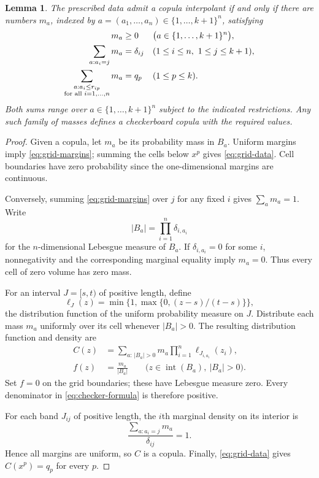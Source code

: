 \documentclass[a4paper,11pt]{amsart}
\numberwithin{equation}{section}
\newtheorem{lemma}[lemma]{Lemma}
\theoremstyle{definition}
\theoremstyle{remark}
\begin{document}
\begin{lemma}\label{lem:grid}
The prescribed data admit a copula interpolant if and only if there
are numbers $m_a$, indexed by
$a=(a_1,\ldots,a_n)\in\{1,\ldots,k+1\}^n$, satisfying
\begin{align}
 m_a&\geq0
 &&\bigl(a\in\{1,\ldots,k+1\}^n\bigr),\notag\\
 \sum_{a:a_i=j}m_a&=\delta_{ij}
 &&(1\leq i\leq n,\ 1\leq j\leq k+1),\label{eq:grid-margins}\\
 \sum_{\substack{a:a_i\leq r_{ip}\\
                  \text{for all }i=1,\ldots,n}}m_a&=q_p
 &&(1\leq p\leq k).\label{eq:grid-data}
\end{align}
Both sums range over $a\in\{1,\ldots,k+1\}^n$ subject to the indicated
restrictions. Any such family of masses defines a checkerboard copula
with the required values.
\end{lemma}
\begin{proof}
Given a copula, let $m_a$ be its probability mass in $B_a$. Uniform
margins imply \eqref{eq:grid-margins}; summing the cells below $x^p$
gives \eqref{eq:grid-data}. Cell boundaries have zero probability
since the one-dimensional margins are continuous.

Conversely, summing \eqref{eq:grid-margins} over $j$ for any fixed
$i$ gives $\sum_a m_a=1$. Write
\[
 |B_a|=\prod_{i=1}^n\delta_{i,a_i}
\]
for the $n$-dimensional Lebesgue measure of $B_a$.
If $\delta_{i,a_i}=0$ for some $i$, nonnegativity and the corresponding
marginal equality imply $m_a=0$. Thus every cell of zero volume has
zero mass.

For an interval $J=[s,t)$ of positive length, define
\[
 \ell_J(z)=\min\{1,\max\{0,(z-s)/(t-s)\}\},
\]
the distribution function of the uniform probability measure on $J$.
Distribute each mass $m_a$ uniformly over its cell whenever $|B_a|>0$.
The resulting distribution function and density are
\begin{equation}
\begin{aligned}
 C(z)&=\sum_{a:\,|B_a|>0}
          m_a\prod_{i=1}^n\ell_{J_{i,a_i}}(z_i),\\
 f(z)&=\frac{m_a}{|B_a|}
       \qquad\bigl(z\in\operatorname{int}(B_a),\ |B_a|>0\bigr).
\end{aligned}
\label{eq:checker-formula}
\end{equation}
Set $f=0$ on the grid boundaries; these have Lebesgue measure zero.
Every denominator in \eqref{eq:checker-formula} is therefore positive.

For each band $J_{ij}$ of positive length, the $i$th marginal density
on its interior is
\[
 \frac{\sum_{a:a_i=j}m_a}{\delta_{ij}}=1.
\]
Hence all margins are uniform, so $C$ is a copula.
Finally, \eqref{eq:grid-data} gives $C(x^p)=q_p$ for every $p$.
\end{proof}
\end{document}
